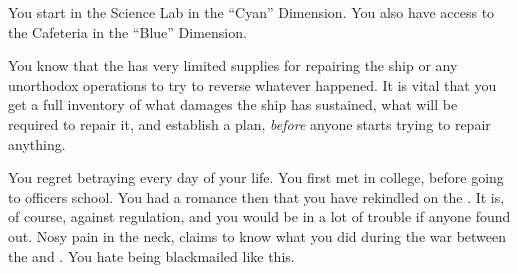 \documentclass[char]{TMFHope}
\begin{document}
\begin{itemz}[Notes]
	\item You start in the Science Lab in the ``Cyan'' Dimension. You also have access to the Cafeteria in the ``Blue'' Dimension. 
	\item You know that the \pNew{} has very limited supplies for repairing the ship or any unorthodox operations to try to reverse whatever happened. It is vital that you get a full inventory of what damages the ship has sustained, what will be required to repair it, and establish a plan, \emph{before} anyone starts trying to repair anything.
\end{itemz}

\begin{contacts}
	\contact{\cCap{}} You regret betraying \cCap{} every day of your life.
	\contact{\cSci{}} You first met \cSci{} in college, before going to officers school. You had a romance then that you have rekindled on the \pNew{}. It is, of course, against regulation, and you would be in a lot of trouble if anyone found out.
	\contact{\cDip{}} Nosy pain in the neck, \cDip{} claims to know what you did during the war between the \pPlan{} and \pEdge{}. You hate being blackmailed like this.
\end{contacts}
\end{document}
